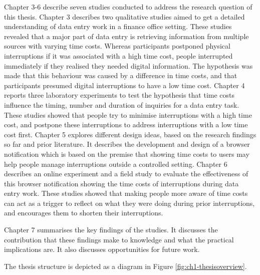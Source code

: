 Chapter 3-6 describe seven studies conducted to address the research question of this thesis. Chapter 3 describes two qualitative studies aimed to get a detailed understanding of data entry work in a finance office setting. These studies revealed that a major part of data entry is retrieving information from multiple sources with varying time costs. Whereas participants postponed physical interruptions if it was associated with a high time cost, people interrupted immediately if they realised they needed digital information. The hypothesis was made that this behaviour was caused by a difference in time costs, and that participants presumed digital interruptions to have a low time cost. Chapter 4 reports three laboratory experiments to test the hypothesis that time costs influence the timing, number and duration of inquiries for a data entry task. These studies showed that people try to minimise interruptions with a high time cost, and postpone these interruptions to address interruptions with a low time cost first. Chapter 5 explores different design ideas, based on the research findings so far and prior literature. It describes the development and design of a browser notification which is based on the premise that showing time costs to users may help people manage interruptions outside a controlled setting. Chapter 6 describes an online experiment and a field study to evaluate the effectiveness of this browser notification showing the time costs of interruptions during data entry work. These studies showed that making people more aware of time costs can act as a trigger to reflect on what they were doing during prior interruptions, and encourages them to shorten their interruptions.

Chapter 7 summarises the key findings of the studies. It discusses the contribution that these findings make to knowledge and what the practical implications are. It also discusses opportunities for future work. 

The thesis structure is depicted as a diagram in Figure \ref{fig:ch1-thesisoverview}.

